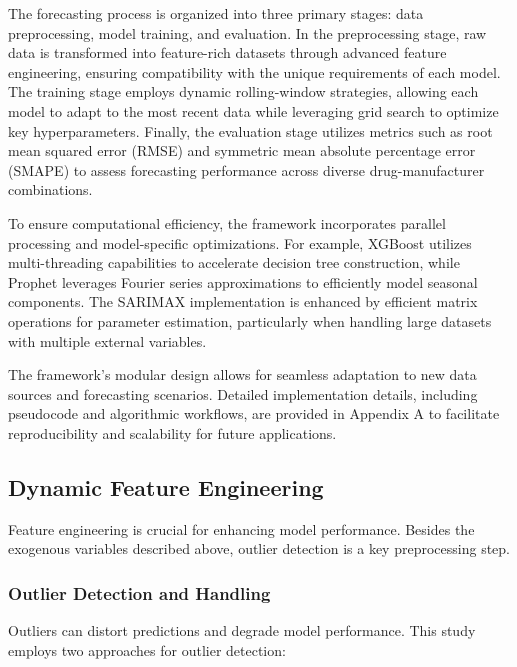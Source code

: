 \documentclass[journal]{IEEEtran}
\begin{document}
The forecasting process is organized into three primary stages: data preprocessing, model training, and evaluation. In the preprocessing stage, raw data is transformed into feature-rich datasets through advanced feature engineering, ensuring compatibility with the unique requirements of each model. The training stage employs dynamic rolling-window strategies, allowing each model to adapt to the most recent data while leveraging grid search to optimize key hyperparameters. Finally, the evaluation stage utilizes metrics such as root mean squared error (RMSE) and symmetric mean absolute percentage error (SMAPE) to assess forecasting performance across diverse drug-manufacturer combinations.

To ensure computational efficiency, the framework incorporates parallel processing and model-specific optimizations. For example, XGBoost utilizes multi-threading capabilities to accelerate decision tree construction, while Prophet leverages Fourier series approximations to efficiently model seasonal components. The SARIMAX implementation is enhanced by efficient matrix operations for parameter estimation, particularly when handling large datasets with multiple external variables.

The framework's modular design allows for seamless adaptation to new data sources and forecasting scenarios. Detailed implementation details, including pseudocode and algorithmic workflows, are provided in Appendix A to facilitate reproducibility and scalability for future applications.



\subsection{Dynamic Feature Engineering}
Feature engineering is crucial for enhancing model performance. Besides the exogenous variables described above, outlier detection is a key preprocessing step.

\subsubsection{Outlier Detection and Handling}
Outliers can distort predictions and degrade model performance. This study employs two approaches for outlier detection:
\end{document}
